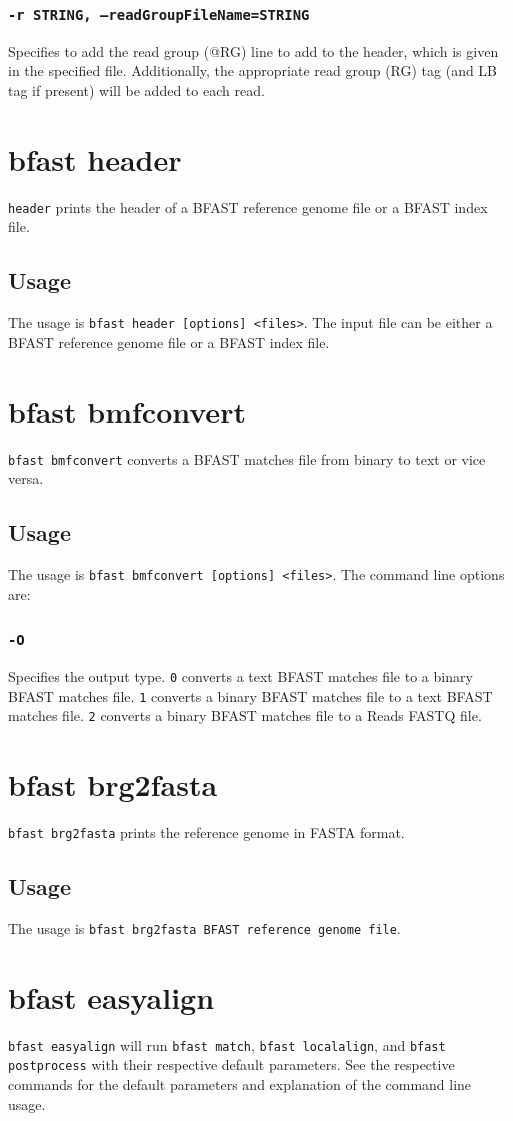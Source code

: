 \documentclass[a4paper,12pt]{book}
\newcommand{\TT}[1]{{\tt #1}} %
\newcommand{\RFF}{Reads FASTQ file}
\newcommand{\BRGF}{BFAST reference genome file} %
\newcommand{\BIF}{BFAST index file} %
\newcommand{\BMF}{BFAST matches file} %
\begin{document}
\subsubsection{\TT{-r STRING, --readGroupFileName=STRING}}
Specifies to add the read group (@RG) line to add to the header, which is given in the specified file.
Additionally, the appropriate read group (RG) tag (and LB tag if present) will be added to each read.
\section{bfast header}
\label{sec:header}
\TT{header} prints the header of a \BRGF{} or a \BIF{}.
\subsection{Usage}
The usage is \TT{bfast header [options] <files>}.
The input file can be either a \BRGF{} or a \BIF{}.

\section{bfast bmfconvert}
\label{sec:bmfconvert}
\TT{bfast bmfconvert} converts a \BMF{} from binary to text or vice versa.
\subsection{Usage}
The usage is \TT{bfast bmfconvert [options] <files>}.
The command line options are:
\subsubsection{\TT{-O}}
Specifies the output type.
\TT{0} converts a text \BMF{} to a binary \BMF{}.
\TT{1} converts a binary \BMF{} to a text \BMF{}.
\TT{2} converts a binary \BMF{} to a \RFF{}.

\section{bfast brg2fasta}
\label{sec:brg2fasta}
\TT{bfast brg2fasta} prints the reference genome in FASTA format.
\subsection{Usage}
The usage is \TT{bfast brg2fasta \BRGF{}}.
\section{bfast easyalign}
\label{sec:easyalign}
\TT{bfast easyalign} will run \TT{bfast match}, \TT{bfast localalign}, and \TT{bfast postprocess} with their respective default parameters. 
See the respective commands for the default parameters and explanation of the command line usage.
\end{document}

